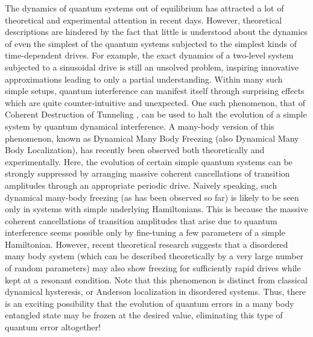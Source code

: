 \documentclass[a4paper,9pt]{article}
\begin{document}
The dynamics of quantum systems out of equilibrium has attracted a lot of theoretical and experimental attention in recent days. However, theoretical descriptions are hindered by the fact that little is understood about the dynamics of even the simplest of the quantum systems subjected to the simplest kinds of time-dependent drives. For example, the exact dynamics of a two-level system subjected to a sinusoidal drive is still an unsolved problem, inspiring innovative approximations leading to only a partial understanding. Within many such simple setups, quantum interference can manifest itself through surprising effects which are quite counter-intuitive and unexpected. One such phenomenon, that of Coherent Destruction of Tunneling , can be used to halt the evolution of a simple system by quantum dynamical interference. A many-body version of this phenomenon, known as Dynamical Many Body Freezing (also Dynamical Many Body Localization), has recently been observed both theoretically and experimentally. Here, 
the evolution of certain simple quantum systems can be strongly suppressed by arranging massive coherent cancellations of transition amplitudes through an appropriate periodic drive.  Naively speaking, such dynamical many-body freezing (as has been observed so far) is likely to be seen only in systems with simple underlying Hamiltonians. This is because the massive coherent cancellations of transition amplitudes that arise due to quantum interference seems possible only by fine-tuning a few parameters of a simple Hamiltonian. However, recent theoretical research suggests that a disordered many body system (which can be described theoretically by a very large number of random parameters) may also show freezing for sufficiently rapid drives while kept at a resonant condition. Note that this phenomenon is distinct from classical dynamical hysteresis, or Anderson localization in disordered systems. Thus, there is an exciting possibility that the evolution of quantum errors in a many body entangled state may be 
frozen at the desired value, eliminating this type of quantum error altogether!
\end{document}
